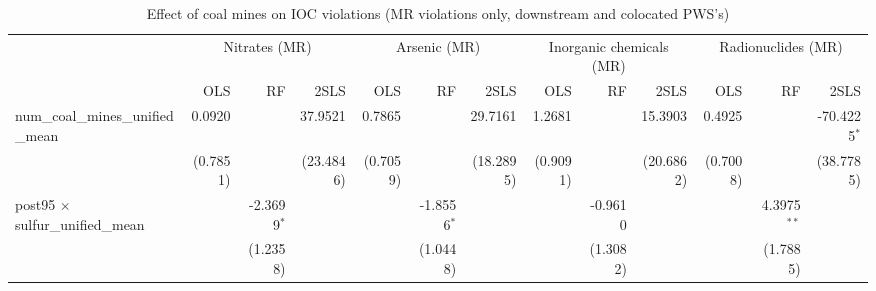 
\begin{table}[htbp]
   
   \caption{\label{2sls_dwnstrmcolocate_minevio_mr} Effect of coal mines on IOC violations (MR violations only, downstream and colocated PWS's)}
   \bigskip
   
   \centering
   
   \begin{adjustbox}{width = \textwidth, center}
      
      
      \begin{tabular}{lrrrrrrrrrrrr}
         \toprule
         
          & \multicolumn{3}{c}{Nitrates (MR)} & \multicolumn{3}{c}{Arsenic (MR)} & \multicolumn{3}{c}{Inorganic chemicals (MR)} & \multicolumn{3}{c}{Radionuclides (MR)}\\
         
                                                                            & OLS                   & RF            & 2SLS      & OLS      & RF            & 2SLS      & OLS      & RF                    & 2SLS                  & OLS                   & RF            & 2SLS\\  
         
         \midrule 
         num\_coal\_mines\_unified\_mean                                    & 0.0920                &               & 37.9521   & 0.7865   &               & 29.7161   & 1.2681   &                       & 15.3903               & 0.4925                &               & -70.4225$^{*}$\\   
                                                                            & (0.7851)              &               & (23.4846) & (0.7059) &               & (18.2895) & (0.9091) &                       & (20.6862)             & (0.7008)              &               & (38.7785)\\   
         post95 $\times$ sulfur\_unified\_mean                              &                       & -2.3699$^{*}$ &           &          & -1.8556$^{*}$ &           &          & -0.9610               &                       &                       & 4.3975$^{**}$ &   \\   
                                                                            &                       & (1.2358)      &           &          & (1.0448)      &           &          & (1.3082)              &                       &                       & (1.7885)      &   \\   
         

\end{tabular}
\end{adjustbox}
\end{table}
